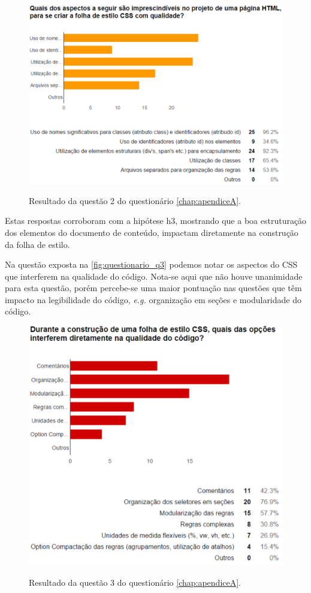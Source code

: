 \begin{figure}[!htb]
	\centering
	\caption{Resultado da questão 2 do questionário \autoref{chap:apendiceA}.}
	\includegraphics[width=1\textwidth]{./04-figuras/questionario_q2}
	\label{fig:questionario_q2}
\end{figure}

Estas respostas corroboram com a hipótese h3, mostrando que a boa estruturação dos elementos do documento de conteúdo, impactam diretamente na construção da folha de estilo.

Na questão exposta na \autoref{fig:questionario_q3} podemos notar os aspectos do CSS que interferem na qualidade do código. Nota-se aqui que não houve unanimidade para esta questão, porém percebe-se uma maior pontuação nas questões que têm impacto na legibilidade do código, \textit{e.g.} organização em seções e modularidade do código.

\begin{figure}[!htb]
	\centering
	\caption{Resultado da questão 3 do questionário \autoref{chap:apendiceA}.}
	\includegraphics[width=1\textwidth]{./04-figuras/questionario_q3}
	\label{fig:questionario_q3}
\end{figure}

